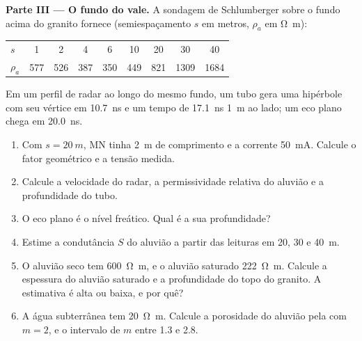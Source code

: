 \begin{problem}
\medskip\noindent\textbf{Parte III --- O fundo do vale.} A sondagem de Schlumberger
sobre o fundo acima do granito fornece (semiespaçamento $s$ em
metros, $\rho_a$ em \unit{\ohm\metre}):
\begin{center}
\small
\begin{tabular}{lcccccccc}
\hline
$s$ & 1 & 2 & 4 & 6 & 10 & 20 & 30 & 40 \\
$\rho_a$ & 577 & 526 & 387 & 350 & 449 & 821 & 1309 & 1684 \\
\hline
\end{tabular}
\end{center}
Em um perfil de radar ao longo do mesmo fundo, um tubo gera uma hipérbole com
seu vértice em \qty{10.7}{ns} e um tempo de \qty{17.1}{ns} \qty{1}{m}
ao lado; um eco plano chega em \qty{20.0}{ns}.
\begin{enumerate}[resume]
\item Com $s = \qty{20}{m}$, MN tinha \qty{2}{m} de comprimento e a corrente
  \qty{50}{mA}. Calcule o fator geométrico e a tensão medida.
\item Calcule a velocidade do radar, a permissividade relativa do
  aluvião e a profundidade do tubo.
\item O eco plano é o nível freático. Qual é a sua profundidade?
\item Estime a condutância $S$ do aluvião a partir das leituras em
  20, 30 e \qty{40}{m}.
\item O aluvião seco tem \qty{600}{\ohm\metre}, e o aluvião saturado
  \qty{222}{\ohm\metre}. Calcule a espessura do aluvião saturado e a
  profundidade do topo do granito. A estimativa é alta
  ou baixa, e por quê?
\item A água subterrânea tem \qty{20}{\ohm\metre}. Calcule a porosidade do
  aluvião pela  com $m = 2$, e o intervalo de $m$
  entre \num{1.3} e \num{2.8}.
\end{enumerate}


\end{problem}
